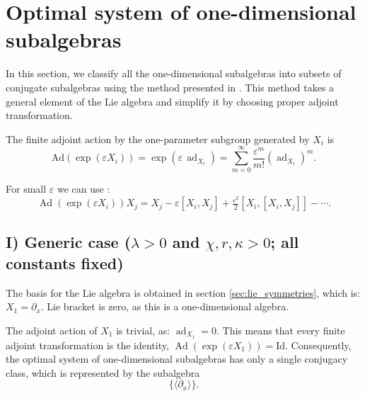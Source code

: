 \documentclass{article}
\begin{document}
\section{Optimal system of one-dimensional subalgebras}\label{sec:OptimalSys}
\par 
In this section, we classify all the one-dimensional subalgebras into subsets of conjugate
subalgebras using the method presented in \cite{olver2000applications}. This method takes a general
element of the Lie algebra and simplify it by choosing proper adjoint transformation.
\par 
The finite adjoint action by the one-parameter subgroup generated by $X_i$ is
\begin{equation*}\label{eq:adj}
\mathrm{Ad}(\exp(\varepsilon X_i))=\exp(\varepsilon\,\operatorname{ad}_{X_i})=\sum_{m=0}^\infty \frac{\varepsilon^m}{m!} (\operatorname{ad}_{X_i})^m.
\end{equation*}
\par 
For small $\varepsilon$ we can use \cite{olver2000applications}:
\begin{equation}
\operatorname{Ad}(\exp(\varepsilon X_i))X_j = X_j -\varepsilon [X_i,X_j] + \tfrac{\varepsilon^2}{2}[X_i,[X_i,X_j]]- \cdots.
\end{equation}

\par 
\subsection*{I) Generic case ($\lambda>0$ and $\chi,r,\kappa>0$; all constants fixed)}
\par 
The basis for the Lie algebra is obtained in section \ref{sec:lie_symmetries}, which is: $X_1=\partial_x$. Lie bracket is zero, as this is a one-dimensional algebra.
\par 
The adjoint action of
 $X_1$
is trivial, as:
$\operatorname{ad}_{X_1}=0$. 
This means that every finite adjoint transformation is the identity, $\operatorname{Ad}(\exp(\varepsilon X_1)) = \mathrm{Id}$. Consequently, the optimal system of one-dimensional subalgebras has only a single conjugacy class, which is represented by the subalgebra 
\begin{equation*}
\{\langle \partial_x\rangle\}.
\end{equation*}
\end{document}
